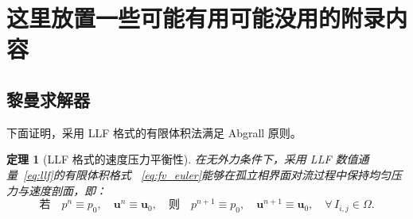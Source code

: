 \documentclass[12pt,a4paper]{article}
\newtheorem{theorem}{定理}[section]
\numberwithin{equation}{section}    %
\begin{document}


\section{这里放置一些可能有用可能没用的附录内容}
\subsection{黎曼求解器}
下面证明，采用 LLF 格式的有限体积法满足 Abgrall 原则。

\begin{theorem}[LLF 格式的速度压力平衡性]
    \label{thm:llf}
    在无外力条件下，采用 LLF 数值通量~\eqref{eq:llf}的有限体积格式
    ~\eqref{eq:fv_euler}能够在孤立相界面对流过程中保持均匀压力与速度剖面，即：
    \begin{equation}
        \text{若}\quad p^n \equiv p_0,\quad \bm{u}^n \equiv \bm{u}_0,
        \quad\text{则}\quad
        p^{n+1} \equiv p_0,\quad \bm{u}^{n+1} \equiv \bm{u}_0,
        \quad \forall\, I_{i,j} \in \Omega.
    \end{equation}
\end{theorem}
\end{document}
